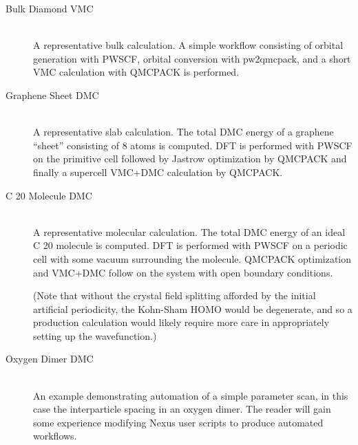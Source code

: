 \documentclass[oneside,11pt]{memoir}
\numberwithin{equation}{section}
\begin{document}
\begin{description}
  \item[Bulk Diamond VMC] \hfill \\
    A representative bulk calculation.  A simple workflow consisting 
    of orbital generation with PWSCF, orbital conversion with pw2qmcpack, 
    and a short VMC calculation with QMCPACK is performed.

  \item[Graphene Sheet DMC] \hfill \\
    A representative slab calculation.  The total DMC energy of a graphene 
    ``sheet'' consisting of 8 atoms is computed.  DFT is performed with 
    PWSCF on the primitive cell followed by Jastrow optimization by QMCPACK 
    and finally a supercell VMC+DMC calculation by QMCPACK.  

  \item[C 20 Molecule DMC] \hfill  \\
    A representative molecular calculation.  The total DMC energy of an ideal 
    C 20 molecule is computed.  DFT is performed with PWSCF on a periodic cell 
    with some vacuum surrounding the molecule.  QMCPACK optimization and 
    VMC+DMC follow on the system with open boundary conditions.  

    (Note that without the crystal field splitting afforded by the initial 
    artificial periodicity, the Kohn-Sham HOMO would be degenerate, and so a 
    production calculation would likely require more care in appropriately 
    setting up the wavefunction.)

  \item[Oxygen Dimer DMC] \hfill \\
    An example demonstrating automation of a simple parameter scan, in this 
    case the interparticle spacing in an oxygen dimer.  The reader will gain 
    some experience modifying Nexus user scripts to produce automated workflows.
\end{description}
\end{document}
